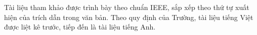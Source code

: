 \documentclass[../main.tex]{subfiles}
\begin{document}
Tài liệu tham khảo được trình bày theo chuẩn IEEE, sắp xếp theo thứ tự xuất hiện của trích dẫn trong văn bản. Theo quy định của Trường, tài liệu tiếng Việt được liệt kê trước, tiếp đến là tài liệu tiếng Anh.
\end{document}
